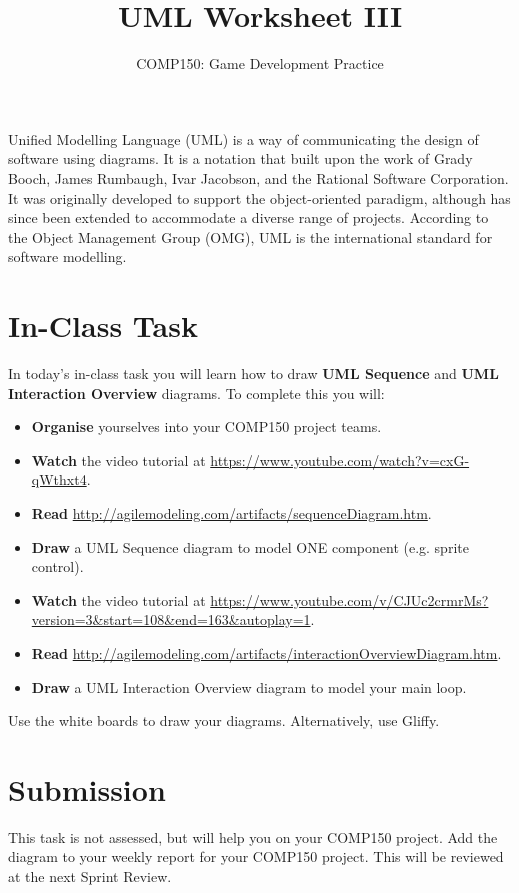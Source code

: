 \documentclass{scrartcl}
\begin{document}
\title{UML Worksheet III}
\author{COMP150: Game Development Practice}
\date{}

\maketitle

Unified Modelling Language (UML) is a way of communicating the design of software using diagrams. It is a notation that built upon the work of Grady Booch, James Rumbaugh, Ivar Jacobson, and the Rational Software Corporation. It was originally developed to support the object-oriented paradigm, although has since been extended to accommodate a diverse range of projects. According to the Object Management Group (OMG), UML is the international standard for software modelling.

\section{In-Class Task}

In today's in-class task you will learn how to draw \textbf{UML Sequence} and \textbf{UML Interaction Overview} diagrams. To complete this you will:

\begin{itemize}
	\item \textbf{Organise} yourselves into your COMP150 project teams.
	\item \textbf{Watch} the video tutorial at \url{https://www.youtube.com/watch?v=cxG-qWthxt4}.
	\item \textbf{Read} \url{http://agilemodeling.com/artifacts/sequenceDiagram.htm}.
	\item \textbf{Draw} a UML Sequence diagram to model ONE component (e.g. sprite control).
	\item \textbf{Watch} the video tutorial at \url{https://www.youtube.com/v/CJUc2crmrMs?version=3\&start=108\&end=163\&autoplay=1}.
	\item \textbf{Read} \url{http://agilemodeling.com/artifacts/interactionOverviewDiagram.htm}.
	\item \textbf{Draw} a UML Interaction Overview diagram to model your main loop.
\end{itemize}

\vspace{0.5ex}

Use the white boards to draw your diagrams. Alternatively, use Gliffy.

\section{Submission}

 This task is not assessed, but will help you on your COMP150 project. Add the diagram to your weekly report for your COMP150 project. This will be reviewed at the next Sprint Review.
\end{document}
